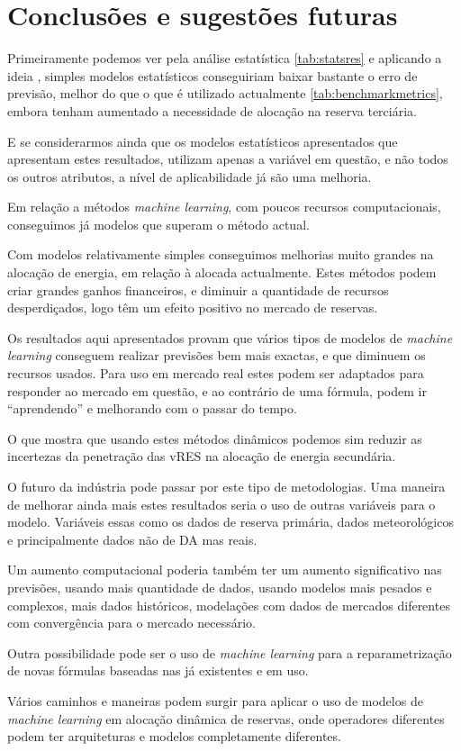 \chapter{Conclusões e sugestões futuras}

Primeiramente podemos ver pela análise estatística \ref{tab:statsres} e aplicando a ideia \cite{Elsayed}, simples modelos estatísticos conseguiriam baixar bastante o erro de previsão, melhor do que o que é utilizado actualmente \ref{tab:benchmarkmetrics}, embora tenham aumentado a necessidade de alocação na reserva terciária.\par
E se considerarmos ainda que os modelos estatísticos apresentados que apresentam estes resultados, utilizam apenas a variável em questão, e não todos os outros atributos, a nível de aplicabilidade já são uma melhoria.\par
Em relação a métodos \textit{machine learning}, com poucos recursos computacionais, conseguimos já modelos que superam o método actual.\par
Com modelos relativamente simples conseguimos melhorias muito grandes na alocação de energia, em relação à alocada actualmente. Estes métodos podem criar grandes ganhos financeiros, e diminuir a quantidade de recursos desperdiçados, logo têm um efeito positivo no mercado de reservas.\par
Os resultados aqui apresentados provam que vários tipos de modelos de \textit{machine learning} conseguem realizar previsões bem mais exactas, e que diminuem os recursos usados. Para uso em mercado real estes podem ser adaptados para responder ao mercado em questão, e ao contrário de uma fórmula, podem ir “aprendendo” e melhorando com o passar do tempo.\par
O que mostra que usando estes métodos dinâmicos podemos sim reduzir as incertezas da penetração das \gls{vRES} na alocação de energia secundária.\par
O futuro da indústria pode passar por este tipo de metodologias. Uma maneira de melhorar ainda mais estes resultados seria o uso de outras variáveis para o modelo. Variáveis essas como os dados de reserva primária, dados meteorológicos e principalmente dados não de \gls{DA} mas reais.\par
Um aumento computacional poderia também ter um aumento significativo nas previsões, usando mais quantidade de dados, usando modelos mais pesados e complexos, mais dados históricos, modelações com dados de mercados diferentes com convergência para o mercado necessário.\par
Outra possibilidade pode ser o uso de \textit{machine learning} para a reparametrização de novas fórmulas baseadas nas já existentes e em uso.\par
Vários caminhos e maneiras podem surgir para aplicar o uso de modelos de \textit{machine learning} em alocação dinâmica de reservas, onde operadores diferentes podem ter arquiteturas e modelos completamente diferentes.
